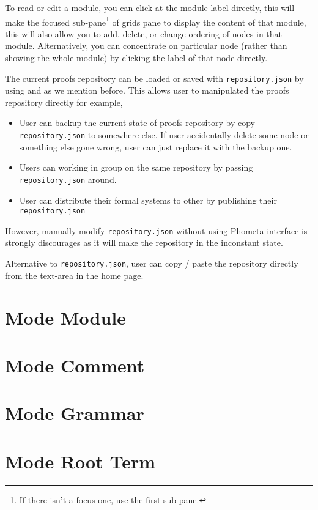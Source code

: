 \documentclass[master.tex]{subfiles}
\begin{document}
To read or edit a module, you can click at the module label directly, this will
make the focused sub-pane\footnote{If there isn't a focus one, use the first
  sub-pane.} of grids pane to display the content of that module, this will also
allow you to add, delete, or change ordering of nodes in that module.
Alternatively, you can concentrate on particular node (rather than showing the
whole module) by clicking the label of that node directly.

The current proofs repository can be loaded or saved with
\texttt{repository.json} by using  and  as we
mention before. This allows user to manipulated the proofs repository directly
for example,
\begin{itemize}
\item User can backup the current state of proofs repository by copy
  \texttt{repository.json} to somewhere else. If user accidentally delete some node
  or something else gone wrong, user can just replace it with the backup one.
\item Users can working in group on the same repository by passing
  \texttt{repository.json} around.
\item User can distribute their formal systems to other by publishing their
  \texttt{repository.json}
\end{itemize}
However, manually modify \texttt{repository.json} without using Phometa
interface is strongly discourages as it will make the repository in the
inconstant state.

Alternative to \texttt{repository.json}, user can copy / paste the repository
directly from the text-area in the home page.

\section{Mode Module}

\section{Mode Comment}

\section{Mode Grammar}

\section{Mode Root Term}
\end{document}
